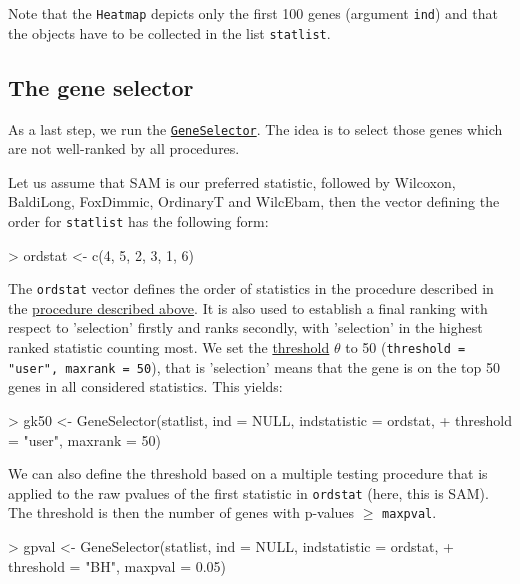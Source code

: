 Note that the \texttt{Heatmap} depicts only the first 100 genes
(argument \texttt{ind}) and that the objects have to be collected
in the list \texttt{statlist}.

\subsection{The gene selector}
As a last step, we run the \hyperlink{gk}{\texttt{GeneSelector}}.
The idea is to select those genes which are not well-ranked by all
procedures.


Let us assume that SAM is our preferred statistic, followed
by Wilcoxon, BaldiLong, FoxDimmic, OrdinaryT and WilcEbam,
then the vector defining the order for \texttt{statlist} has the following form:

\begin{Schunk}
\begin{Sinput}
> ordstat <- c(4, 5, 2, 3, 1, 6)
\end{Sinput}
\end{Schunk}

The \texttt{ordstat} vector defines the order of statistics in the procedure
described in the \hyperlink{ordstat}{procedure described above}. It is also
used to establish a final ranking with respect to 'selection' firstly and ranks
secondly, with 'selection' in the highest ranked statistic counting most.
We set the \hyperlink{thres}{threshold} $\theta$ to 50
(\texttt{threshold = "user", maxrank = 50}), that is 'selection' means
that the gene is on the top 50 genes in all considered statistics. This yields:

\begin{Schunk}
\begin{Sinput}
> gk50 <- GeneSelector(statlist, ind = NULL, indstatistic = ordstat, 
+     threshold = "user", maxrank = 50)
\end{Sinput}
\end{Schunk}

We can also define the threshold based on a multiple testing
procedure that is applied to the raw pvalues of the first statistic
in \texttt{ordstat} (here, this is SAM). The threshold is then the number of
genes with p-values $\geq$ \texttt{maxpval}.

\begin{Schunk}
\begin{Sinput}
> gpval <- GeneSelector(statlist, ind = NULL, indstatistic = ordstat, 
+     threshold = "BH", maxpval = 0.05)
\end{Sinput}
\end{Schunk}

